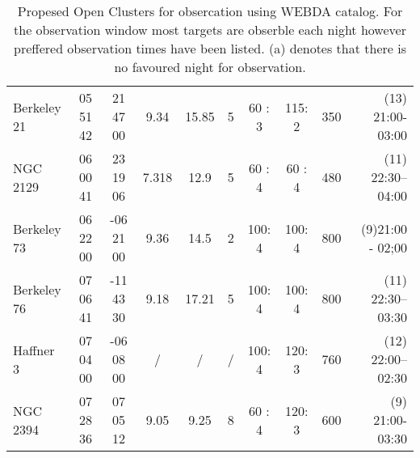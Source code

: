 \begin{landscape}
\begin{table}[h!]
\begin{tabular}{lccccccccr}
            Berkeley   21 & 05   51 42 & 21   47 00  & 9.34  & 15.85 & 5    & 60 : 3         & 115: 2         & 350   & (13)   21:00-03:00   \\
            NGC 2129      & 06   00 41 & 23   19 06  & 7.318 & 12.9  & 5    & 60 : 4         & 60 : 4         & 480   & (11)   22:30--04:00  \\
            Berkeley 73   & 06   22 00 & -06   21 00 & 9.36  & 14.5  & 2    & 100: 4         & 100: 4         & 800   & (9)21:00   - 02;00   \\
            Berkeley 76   & 07   06 41 & -11   43 30 & 9.18  & 17.21 & 5    & 100: 4         & 100: 4         & 800   & (11)   22:30--03:30  \\
            Haffner 3     & 07   04 00 & -06   08 00 &    /   &    /   &   /   & 100: 4      & 120: 3         & 760   & (12)   22:00--02:30  \\
            NGC 2394      & 07   28 36 & 07   05 12  & 9.05  & 9.25  & 8    & 60 : 4         & 120: 3         & 600   & (9)   21:00-03:30   \\ \hline 
            \end{tabular}
    \caption{Propesed Open Clusters for obsercation using WEBDA catalog. For the observation window most targets are obserble each night however preffered observation times have been listed. (a) denotes that there is no favoured night for observation.}
    \label{tb: targets}
    \end{table}
\end{landscape}
